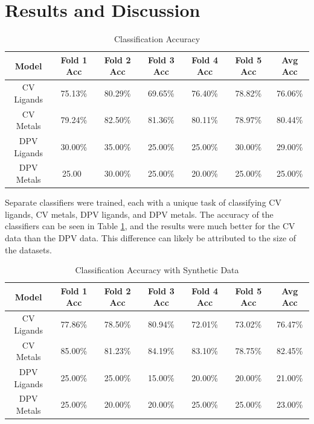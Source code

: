 \section{Results and Discussion}
\begin{table}[!h]
\begin{center}
\begin{tabular}{c|c|c|c|c|c|c}
Model & Fold 1 Acc & Fold 2 Acc & Fold 3 Acc & Fold 4 Acc & Fold 5 Acc & Avg Acc\\
\hline
CV Ligands & 75.13\% & 80.29\% & 69.65\% & 76.40\% & 78.82\% & 76.06\%\\
CV Metals & 79.24\% & 82.50\% & 81.36\% & 80.11\% & 78.97\% & 80.44\%\\
DPV Ligands & 30.00\% & 35.00\% & 25.00\% & 25.00\% & 30.00\% & 29.00\%\\
DPV Metals & 25.00\ & 30.00\% & 25.00\% & 20.00\% & 25.00\% & 25.00\%\\
\end{tabular}
\caption{Classification Accuracy}
\label{classification_results}
\end{center}
\end{table}
Separate classifiers were trained, each with a unique task of classifying CV ligands, CV metals, DPV ligands, and DPV metals. 
The accuracy of the classifiers can be seen in Table \ref{classification_results}, and the results were much better for the CV data than the DPV data. This difference can likely be attributed to the size of the datasets. 
\begin{table}[!h]
\begin{center}
\begin{tabular}{c|c|c|c|c|c|c}
Model & Fold 1 Acc & Fold 2 Acc & Fold 3 Acc & Fold 4 Acc & Fold 5 Acc & Avg Acc \\
\hline
CV Ligands & 77.86\% & 78.50\% & 80.94\% & 72.01\% & 73.02\% & 76.47\%\\
CV Metals & 85.00\% & 81.23\% & 84.19\% & 83.10\% & 78.75\% & 82.45\%\\
DPV Ligands & 25.00\% & 25.00\% & 15.00\% & 20.00\% & 20.00\% & 21.00\%\\
DPV Metals & 25.00\% & 20.00\% & 20.00\% & 25.00\% & 25.00\% & 23.00\%
\end{tabular}
\caption{Classification Accuracy with Synthetic Data}
\label{vae_classification_results}
\end{center}
\end{table}
